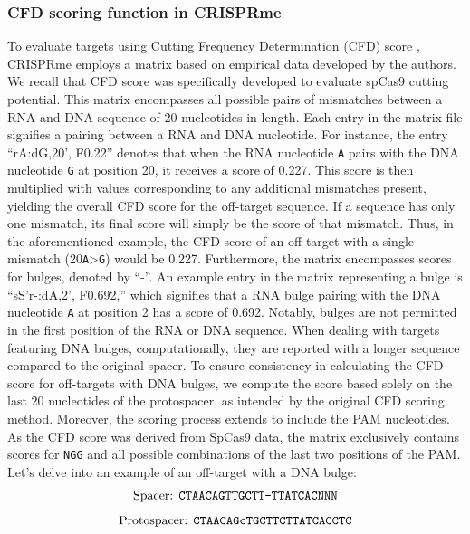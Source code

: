 \documentclass[a4paper, titlepage, openright]{book}
\newcommand{\crisprme}{CRISPRme\xspace}
\begin{document}
\subsubsection{CFD scoring function in \crisprme}
To evaluate targets using Cutting Frequency Determination (CFD) score \citep{doench2016optimized}, \crisprme employs a matrix based on empirical data developed by the authors. We recall that CFD score was specifically developed to evaluate spCas9 cutting potential. This matrix encompasses all possible pairs of mismatches between a RNA and DNA sequence of 20 nucleotides in length. Each entry in the matrix file signifies a pairing between a RNA and DNA nucleotide. For instance, the entry ``rA:dG,20', F0.22'' denotes that when the RNA nucleotide \texttt{A} pairs with the DNA nucleotide \texttt{G} at position 20, it receives a score of 0.227. This score is then multiplied with values corresponding to any additional mismatches present, yielding the overall CFD score for the off-target sequence. If a sequence has only one mismatch, its final score will simply be the score of that mismatch. Thus, in the aforementioned example, the CFD score of an off-target with a single mismatch (20\texttt{A}>\texttt{G}) would be 0.227. Furthermore, the matrix encompasses scores for bulges, denoted by ``-''. An example entry in the matrix representing a bulge is ``sS'r-:dA,2', F0.692,'' which signifies that a RNA bulge pairing with the DNA nucleotide \texttt{A} at position 2 has a score of 0.692. Notably, bulges are not permitted in the first position of the RNA or DNA sequence. When dealing with targets featuring DNA bulges, computationally, they are reported with a longer sequence compared to the original spacer. To ensure consistency in calculating the CFD score for off-targets with DNA bulges, we compute the score based solely on the last 20 nucleotides of the protospacer, as intended by the original CFD scoring method. Moreover, the scoring process extends to include the PAM nucleotides. As the CFD score was derived from SpCas9 data, the matrix exclusively contains scores for \texttt{NGG} and all possible combinations of the last two positions of the PAM. Let's delve into an example of an off-target with a DNA bulge: 
\[
    \text{Spacer: \texttt{CTAACAGTTGCTT-TTATCACNNN}}
\] 
\[
    \text{Protospacer: \texttt{CTAACAGcTGCTTCTTATCACCTC}}
\]
\end{document}
